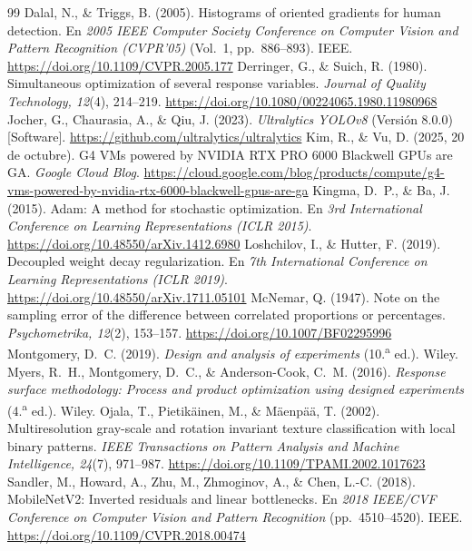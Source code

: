 \documentclass[conference]{IEEEtran}
\begin{document}
\begin{thebibliography}{99}
 Dalal, N., \& Triggs, B. (2005). Histograms of oriented gradients for human detection. En \emph{2005 IEEE Computer Society Conference on Computer Vision and Pattern Recognition (CVPR'05)} (Vol.~1, pp.~886--893). IEEE. \url{https://doi.org/10.1109/CVPR.2005.177}
 Derringer, G., \& Suich, R. (1980). Simultaneous optimization of several response variables. \emph{Journal of Quality Technology, 12}(4), 214--219. \url{https://doi.org/10.1080/00224065.1980.11980968}
 Jocher, G., Chaurasia, A., \& Qiu, J. (2023). \emph{Ultralytics YOLOv8} (Versión 8.0.0) [Software]. \url{https://github.com/ultralytics/ultralytics}
 Kim, R., \& Vu, D. (2025, 20 de octubre). G4 VMs powered by NVIDIA RTX PRO 6000 Blackwell GPUs are GA. \emph{Google Cloud Blog}. \url{https://cloud.google.com/blog/products/compute/g4-vms-powered-by-nvidia-rtx-6000-blackwell-gpus-are-ga}
 Kingma, D.~P., \& Ba, J. (2015). Adam: A method for stochastic optimization. En \emph{3rd International Conference on Learning Representations (ICLR 2015)}. \url{https://doi.org/10.48550/arXiv.1412.6980}
 Loshchilov, I., \& Hutter, F. (2019). Decoupled weight decay regularization. En \emph{7th International Conference on Learning Representations (ICLR 2019)}. \url{https://doi.org/10.48550/arXiv.1711.05101}
 McNemar, Q. (1947). Note on the sampling error of the difference between correlated proportions or percentages. \emph{Psychometrika, 12}(2), 153--157. \url{https://doi.org/10.1007/BF02295996}
 Montgomery, D.~C. (2019). \emph{Design and analysis of experiments} (10.\textsuperscript{a} ed.). Wiley.
 Myers, R.~H., Montgomery, D.~C., \& Anderson-Cook, C.~M. (2016). \emph{Response surface methodology: Process and product optimization using designed experiments} (4.\textsuperscript{a} ed.). Wiley.
 Ojala, T., Pietikäinen, M., \& Mäenpää, T. (2002). Multiresolution gray-scale and rotation invariant texture classification with local binary patterns. \emph{IEEE Transactions on Pattern Analysis and Machine Intelligence, 24}(7), 971--987. \url{https://doi.org/10.1109/TPAMI.2002.1017623}
 Sandler, M., Howard, A., Zhu, M., Zhmoginov, A., \& Chen, L.-C. (2018). MobileNetV2: Inverted residuals and linear bottlenecks. En \emph{2018 IEEE/CVF Conference on Computer Vision and Pattern Recognition} (pp.~4510--4520). IEEE. \url{https://doi.org/10.1109/CVPR.2018.00474}

\end{thebibliography}
\end{document}
